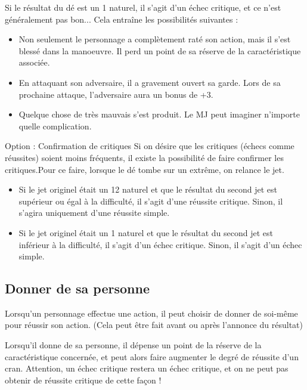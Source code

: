 \documentclass[10pt,twoside,twocolumn,openany,bg=print,justified]{dndbook}
\begin{document}
Si le résultat du dé est un 1 naturel, il s'agit d'un échec critique, et ce n'est généralement pas bon... Cela entraîne les possibilités suivantes :

\begin{itemize}
	\item Non seulement le personnage a complètement raté son action, mais il s'est blessé dans la manoeuvre. Il perd un point de sa réserve de la caractéristique associée.
	\item En attaquant son adversaire, il a gravement ouvert sa garde. Lors de sa prochaine attaque, l'adversaire aura un bonus de +3.
	\item Quelque chose de très mauvais s'est produit. Le MJ peut imaginer n'importe quelle complication.
\end{itemize}

\begin{paperbox}{Option : Confirmation de critiques}
Si on désire que les critiques (échecs comme réussites) soient moins fréquents, il existe la possibilité de faire confirmer les critiques.Pour ce faire, lorsque le dé tombe sur un extrême, on relance le jet.

\begin{itemize}
\item Si le jet originel était un 12 naturel et que le résultat du second jet est supérieur ou égal à la difficulté, il s'agit d'une réussite critique. Sinon, il s'agira uniquement d'une réussite simple.
\item Si le jet originel était un 1 naturel et que le résultat du second jet est inférieur à la difficulté, il s'agit d'un échec critique. Sinon, il s'agit d'un échec simple.
\end{itemize}
\end{paperbox}

\subsection*{Donner de sa personne}

Lorsqu'un personnage effectue une action, il peut choisir de donner de soi-même pour réussir son action. (Cela peut être fait avant ou après l'annonce du résultat)

Lorsqu'il donne de sa personne, il dépense un point de la réserve de la caractéristique concernée, et peut alors faire augmenter le degré de réussite d'un cran. Attention, un échec critique restera un échec critique, et on ne peut pas obtenir de réussite critique de cette façon !
\end{document}
